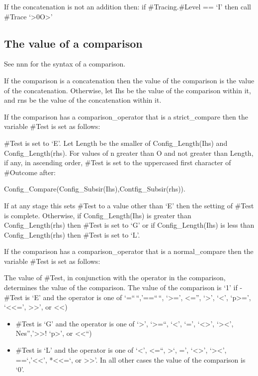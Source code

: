 If the concatenation is not an addition then: if \#Tracing.\#Level ==
`I' then call \#Trace `\textgreater0O\textgreater{}'

\subsection{The value of a comparison}\label{the-value-of-a-comparison}

See nnn for the syntax of a comparison.

If the comparison is a concatenation then the value of the comparison is
the value of the concatenation. Otherwise, let Ihs be the value of the
comparison within it, and rns be the value of the concatenation within
it.

If the comparison has a comparison\_operator that is a strict\_compare
then the variable \#Test is set as follows:

\#Test is set to `E'. Let Length be the smaller of Config\_Length(Ihs)
and Config\_Length(rhs). For values of n greater than O and not greater
than Length, if any, in ascending order, \#Test is set to the uppercased
first character of \#Outcome after:

Config\_Compare(Config\_Subsir(Ihs),Contfig\_Subsir(rhs)).

If at any stage this sets \#Test to a value other than `E' then the
setting of \#Test is complete. Otherwise, if Config\_Length(Ihs) is
greater than Config\_Length(rhs) then \#Test is set to `G' or if
Config\_Length(Ihs) is less than Config\_Length(rhs) then \#Test is set
to `L'.

If the comparison has a comparison\_operator that is a normal\_compare
then the variable \#Test is set as follows:



The value of \#Test, in conjunction with the operator in the comparison,
determines the value of the comparison. The value of the comparison is
`1' if - \#Test is `E' and the operator is one of `=``\,``,'==``\,``,
`\textgreater=', \textless='', `\textgreater{}', `\textless{}',
`p\textgreater=', `\textless\textless=', \textgreater\textgreater', or
\textless\textless)

\begin{itemize}
\tightlist
\item
  \#Test is `G' and the operator is one of `\textgreater{}',
  `\textgreater=``, `\textless{}', `=', `\textless\textgreater{}',
  `\textgreater\textless{}', Nes'','\textgreater\textgreater!
  `p\textgreater{}', or \textless\textless``)
\item
  \#Test is `L' and the operator is one of `\textless{}', \textless=``,
  \textgreater{}`, =', `\textless\textgreater{}',
  `\textgreater\textless{}', ==`,'\textless\textless',
  *\textless\textless=`, or \textgreater\textgreater{}'. In all other
  cases the value of the comparison is `0'.
\end{itemize}

